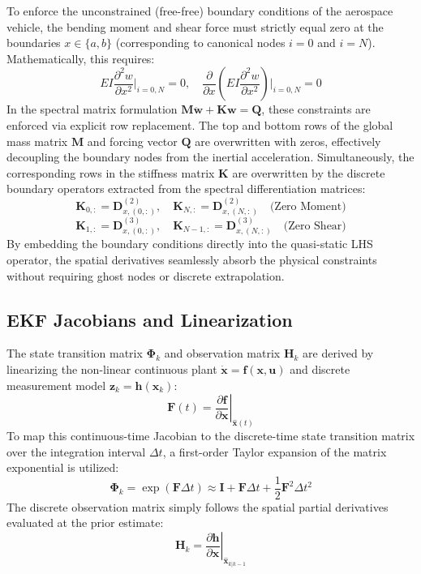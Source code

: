\documentclass[11pt,a4paper]{article}
\theoremstyle{definition}
\numberwithin{equation}{section}
\begin{document}
\begin{appendices}
To enforce the unconstrained (free-free) boundary conditions of the aerospace vehicle, the bending moment and shear force must strictly equal zero at the boundaries $x \in \{a, b\}$ (corresponding to canonical nodes $i=0$ and $i=N$). Mathematically, this requires:
\begin{equation}
    EI \frac{\partial^2 w}{\partial x^2} \bigg|_{i=0, N} = 0, \quad \frac{\partial}{\partial x} \left( EI \frac{\partial^2 w}{\partial x^2} \right) \bigg|_{i=0, N} = 0
\end{equation}
In the spectral matrix formulation $\mathbf{M} \mathbf{\ddot{w}} + \mathbf{K} \mathbf{w} = \mathbf{Q}$, these constraints are enforced via explicit row replacement. The top and bottom rows of the global mass matrix $\mathbf{M}$ and forcing vector $\mathbf{Q}$ are overwritten with zeros, effectively decoupling the boundary nodes from the inertial acceleration. Simultaneously, the corresponding rows in the stiffness matrix $\mathbf{K}$ are overwritten by the discrete boundary operators extracted from the spectral differentiation matrices:
\begin{equation}
    \mathbf{K}_{0, :} = \mathbf{D}_{x, (0, :)}^{(2)}, \quad \mathbf{K}_{N, :} = \mathbf{D}_{x, (N, :)}^{(2)} \quad \text{(Zero Moment)}
\end{equation}
\begin{equation}
    \mathbf{K}_{1, :} = \mathbf{D}_{x, (0, :)}^{(3)}, \quad \mathbf{K}_{N-1, :} = \mathbf{D}_{x, (N, :)}^{(3)} \quad \text{(Zero Shear)}
\end{equation}
By embedding the boundary conditions directly into the quasi-static LHS operator, the spatial derivatives seamlessly absorb the physical constraints without requiring ghost nodes or discrete extrapolation.

\subsection{EKF Jacobians and Linearization}
The state transition matrix $\boldsymbol{\Phi}_k$ and observation matrix $\mathbf{H}_k$ are derived by linearizing the non-linear continuous plant $\dot{\mathbf{x}} = \mathbf{f}(\mathbf{x}, \mathbf{u})$ and discrete measurement model $\mathbf{z}_k = \mathbf{h}(\mathbf{x}_k)$:
\begin{equation}
    \mathbf{F}(t) = \left. \frac{\partial \mathbf{f}}{\partial \mathbf{x}} \right|_{\hat{\mathbf{x}}(t)}
\end{equation}
To map this continuous-time Jacobian to the discrete-time state transition matrix over the integration interval $\Delta t$, a first-order Taylor expansion of the matrix exponential is utilized:
\begin{equation}
    \boldsymbol{\Phi}_k = \exp(\mathbf{F} \Delta t) \approx \mathbf{I} + \mathbf{F} \Delta t + \frac{1}{2}\mathbf{F}^2 \Delta t^2
\end{equation}
The discrete observation matrix simply follows the spatial partial derivatives evaluated at the prior estimate:
\begin{equation}
    \mathbf{H}_k = \left. \frac{\partial \mathbf{h}}{\partial \mathbf{x}} \right|_{\hat{\mathbf{x}}_{k|k-1}}
\end{equation}


\end{appendices}
\end{document}
